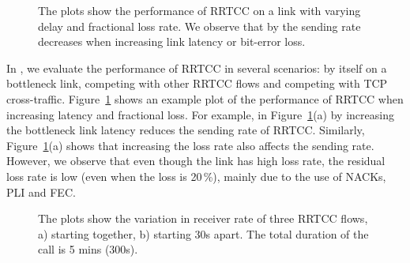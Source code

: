 \begin{figure}[!t]
  \centerline{
   }
   \centerline{
  }
  \caption{The plots show the performance of RRTCC on a link with varying
  delay and fractional loss rate. We observe that by the sending rate
  decreases when increasing link latency or bit-error loss. }
  \label{fig:rrtcc-single}
\end{figure}

\begin{table}[!t]
\begin{center}{
  }
\end{center}
\caption{RRTCC: Metrics for a bottleneck with different packet loss rates.}
\label{tab:rrtcc-loss}
\end{table}

In , we evaluate the performance of RRTCC in several
scenarios: by itself on a bottleneck link, competing with other RRTCC flows
and competing with TCP cross-traffic. Figure~\ref{fig:rrtcc-single} shows an
example plot of the performance of RRTCC when increasing latency and
fractional loss. For example, in Figure~\ref{fig:rrtcc-single}(a) by
increasing the bottleneck link latency reduces the sending rate of RRTCC.
Similarly, Figure~\ref{fig:rrtcc-single}(a) shows that increasing the loss
rate also affects the sending rate. However, we observe that even though the
link has high loss rate, the residual loss rate is low (even when the loss is
20\,\%), mainly due to the use of NACKs, PLI and FEC.


\begin{figure}[!t]
\centerline{
  }
  \centerline{
  }
   \caption{The plots show the variation in receiver rate of three RRTCC
   flows, a) starting together, b) starting 30s apart. The total duration of
   the call is 5 mins (300s).}
\label{fig:rrtcc-self-fair}
\end{figure}

